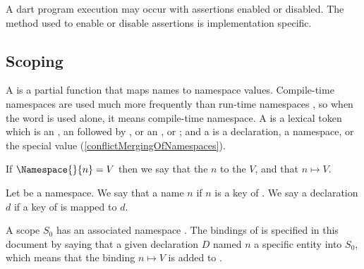 \documentclass[makeidx]{article}
\begin{document}
\LMHash{}%
A dart program execution may occur with assertions enabled or disabled.
The method used to enable or disable assertions is implementation specific.


\subsection{Scoping}

\LMHash{}%
A 
is a partial function that maps names to namespace values.
Compile-time namespaces are used much more frequently than run-time namespaces
,
so when the word  is used alone,
it means compile-time namespace.
A  is a lexical token which is an ,
an  followed by \lit{=}, or
an ,
or ;
and a  is
a declaration, a namespace, or the special value \ConflictValue{}
(\ref{conflictMergingOfNamespaces}).

\LMHash{}%
If $\Namespace{}{n} = V$ then we say that \NamespaceName{}
the
$n$ to the
$V$,
and that \NamespaceName{}
$n\mapsto{}V$.

\LMHash{}%
Let \NamespaceName{} be a namespace.
We say that a name $n$  \NamespaceName{}
if $n$ is a key of \NamespaceName.
We say a declaration $d$  \NamespaceName{}
if a key of \NamespaceName{} is mapped to $d$.

\LMHash{}%
A scope $S_0$ has an associated namespace .
The bindings of  is specified in this document by saying that
a given declaration $D$ named $n$
a specific entity  into $S_0$,
which means that the binding $n\mapsto{}V$ is added to .

\end{document}
